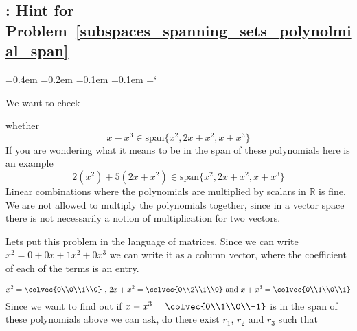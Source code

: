 
\subsection{\subspacesTitle: Hint for Problem~\ref{subspaces_spanning_sets_polynolmial_span}}

{\ttfamily
{}\font=0.4em
\font=0.2em
\font=0.1em
\font=0.1em
\hyphenchar\font=`\-

\hypertarget{subspaces_and_spanning_sets_hint_2}{We want to check} whether 
\[
x-x^3 \in \text{span}\{x^2, 2x+x^2, x+ x^3 \}
\]
If you are wondering what it means to be in the span of these polynomials here is an example
\[
2(x^2) + 5(2x+x^2) \in \text{span}\{x^2, 2x+x^2, x+ x^3 \}
\]
Linear combinations where the polynomials are multiplied by scalars in $\mathbb{R}$ is fine. We are not allowed to multiply the polynomials together, since in a vector space there is not necessarily a notion of multiplication for two vectors.

Lets put this problem in the language of matrices. Since we can write $x^2 = 0 + 0x+1x^2 +0x^3$ we can write it as a column vector, where the coefficient of each of the terms is an entry.

\[
x^2 =\colvec{0\\0\\1\\0} \text{ , } 2x+x^2 =\colvec{0\\2\\1\\0} \text{ and }
x+x^3 =\colvec{0\\1\\0\\1}
 \]
Since we want to find out if $x-x^3 =\colvec{0\\1\\0\\-1}$ is in the span of these polynomials above we can ask, do there exist $r_1$, $r_2$ and $r_3$ such that 

}
